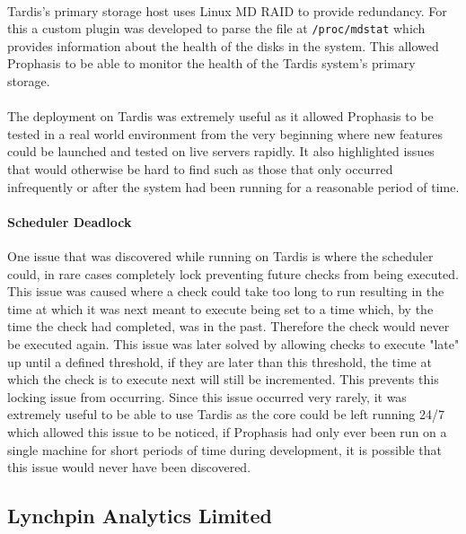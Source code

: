 \documentclass[bsc,logo,twoside,singlespacing,notimes]{infthesis}
\begin{document}
\paragraph*{}
	Tardis's primary storage host uses Linux MD RAID to provide redundancy.  For
	this a custom plugin was developed to parse the file at \texttt{/proc/mdstat}
	which provides information about the health of the disks in the system. This
	allowed Prophasis to be able to monitor the health of the Tardis system's
	primary storage.
	
\paragraph*{}
	The deployment on Tardis was extremely useful as it allowed Prophasis to be
	tested in a real world environment from the very beginning where new features
	could be launched and tested on live servers rapidly.  It also highlighted
	issues that would otherwise be hard to find such as those that only occurred
	infrequently or after the system had been running for a reasonable period of
	time.
	
\paragraph*{Scheduler Deadlock} %
	One issue that was discovered while running on Tardis is where the scheduler
	could, in rare cases completely lock preventing future checks from being
	executed.  This issue was caused where a check could take too long to run
	resulting in the time at which it was next meant to execute being set to a
	time which, by the time the check had completed, was in the past.  Therefore
	the check would never be executed again.  This issue was later solved by
	allowing checks to execute "late" up until a defined threshold, if they are
	later than this threshold, the time at which the check is to execute next will
	still be incremented.  This prevents this locking issue from occurring. Since
	this issue occurred very rarely, it was extremely useful to be able to use
	Tardis as the core could be left running 24/7 which allowed this issue to be
	noticed, if Prophasis had only ever been run on a single machine for short
	periods of time during development, it is possible that this issue would never
	have been discovered.

\pagebreak
\subsection{Lynchpin Analytics Limited}
\end{document}
